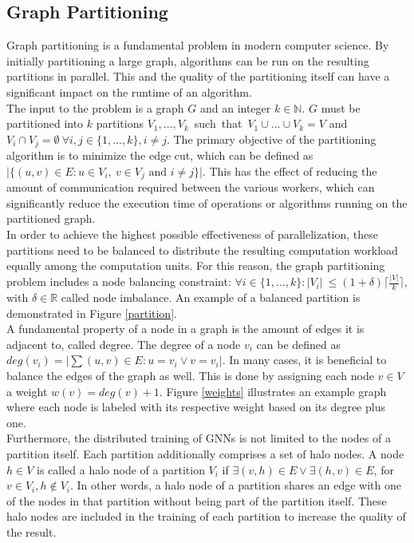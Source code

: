\documentclass[acmsmall,nonacm,screen,review]{acmart}
\begin{document}
\subsection{Graph Partitioning}
Graph partitioning is a fundamental problem in modern computer science. By initially partitioning a large graph, algorithms can be run on the resulting partitions in parallel. This and the quality of the partitioning itself can have a significant impact on the runtime of an algorithm. \\ 
The input to the problem is a graph $G$ and an integer $k\in \mathbb{N}$. $G$ must be partitioned into $k$ partitions \hbox{$V_{1},...,V_{k}$ such that $V_{1}\cup...\cup V_{k} = V$} and $V_{i}\cap V_{j} = \emptyset\ \forall i,j\in \{1,...,k\}, i \neq j$. The primary objective of the partitioning algorithm is to minimize the edge cut, which can be defined as \hbox{$\vert \{(u,v)\in E : u\in V_{i},\ v\in V_{j} \text{ and } i\neq j \}\vert$.} This has the effect of reducing the amount of communication required between the various workers, which can significantly reduce the execution time of operations or algorithms running on the partitioned graph.  \\
In order to achieve the highest possible effectiveness of parallelization, these partitions need to be balanced to distribute the resulting computation workload equally among the computation units. For this reason, the graph partitioning problem includes a node balancing constraint: $\forall i\in \{1,...,k\} : \vert V_{i}\vert \ \leq (1 + \delta) \lceil \frac{\vert V \vert }{k} \rceil $, with $\delta \in \mathbb{R}$ called node imbalance. An example of a balanced partition is demonstrated in Figure \ref{partition}.\\
A fundamental property of a node in a graph is the amount of edges it is adjacent to, called degree. The degree of a node $v_{i}$ can be defined as $deg(v_{i}) = \vert\sum{(u,v)\in E : u = v_{i} \vee v = v_{i}}\vert$. 
In many cases, it is beneficial to balance the edges of the graph as well. This is done by assigning each node $v \in V$ a weight $w(v) = deg(v) + 1$. Figure \ref{weights} illustrates an example graph where each node is labeled with its respective weight based on its degree plus one. \\
Furthermore, the distributed training of GNNs is not limited to the nodes of a partition itself. Each partition additionally comprises a set of halo nodes. A node $h \in V$ is called a halo node of a partition $V_{i}$ if $\exists (v,h) \in E \vee \exists (h,v) \in E$, for $v \in V_{i}, h \notin V_{i}$. In other words, a halo node of a partition shares an edge with one of the nodes in that partition without being part of the partition itself. These halo nodes are included in the training of each partition to increase the quality of the result. 
\end{document}

